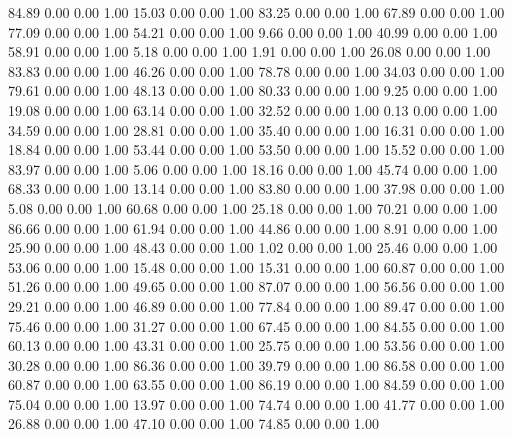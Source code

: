    84.89   0.00   0.00   1.00
   15.03   0.00   0.00   1.00
   83.25   0.00   0.00   1.00
   67.89   0.00   0.00   1.00
   77.09   0.00   0.00   1.00
   54.21   0.00   0.00   1.00
    9.66   0.00   0.00   1.00
   40.99   0.00   0.00   1.00
   58.91   0.00   0.00   1.00
    5.18   0.00   0.00   1.00
    1.91   0.00   0.00   1.00
   26.08   0.00   0.00   1.00
   83.83   0.00   0.00   1.00
   46.26   0.00   0.00   1.00
   78.78   0.00   0.00   1.00
   34.03   0.00   0.00   1.00
   79.61   0.00   0.00   1.00
   48.13   0.00   0.00   1.00
   80.33   0.00   0.00   1.00
    9.25   0.00   0.00   1.00
   19.08   0.00   0.00   1.00
   63.14   0.00   0.00   1.00
   32.52   0.00   0.00   1.00
    0.13   0.00   0.00   1.00
   34.59   0.00   0.00   1.00
   28.81   0.00   0.00   1.00
   35.40   0.00   0.00   1.00
   16.31   0.00   0.00   1.00
   18.84   0.00   0.00   1.00
   53.44   0.00   0.00   1.00
   53.50   0.00   0.00   1.00
   15.52   0.00   0.00   1.00
   83.97   0.00   0.00   1.00
    5.06   0.00   0.00   1.00
   18.16   0.00   0.00   1.00
   45.74   0.00   0.00   1.00
   68.33   0.00   0.00   1.00
   13.14   0.00   0.00   1.00
   83.80   0.00   0.00   1.00
   37.98   0.00   0.00   1.00
    5.08   0.00   0.00   1.00
   60.68   0.00   0.00   1.00
   25.18   0.00   0.00   1.00
   70.21   0.00   0.00   1.00
   86.66   0.00   0.00   1.00
   61.94   0.00   0.00   1.00
   44.86   0.00   0.00   1.00
    8.91   0.00   0.00   1.00
   25.90   0.00   0.00   1.00
   48.43   0.00   0.00   1.00
    1.02   0.00   0.00   1.00
   25.46   0.00   0.00   1.00
   53.06   0.00   0.00   1.00
   15.48   0.00   0.00   1.00
   15.31   0.00   0.00   1.00
   60.87   0.00   0.00   1.00
   51.26   0.00   0.00   1.00
   49.65   0.00   0.00   1.00
   87.07   0.00   0.00   1.00
   56.56   0.00   0.00   1.00
   29.21   0.00   0.00   1.00
   46.89   0.00   0.00   1.00
   77.84   0.00   0.00   1.00
   89.47   0.00   0.00   1.00
   75.46   0.00   0.00   1.00
   31.27   0.00   0.00   1.00
   67.45   0.00   0.00   1.00
   84.55   0.00   0.00   1.00
   60.13   0.00   0.00   1.00
   43.31   0.00   0.00   1.00
   25.75   0.00   0.00   1.00
   53.56   0.00   0.00   1.00
   30.28   0.00   0.00   1.00
   86.36   0.00   0.00   1.00
   39.79   0.00   0.00   1.00
   86.58   0.00   0.00   1.00
   60.87   0.00   0.00   1.00
   63.55   0.00   0.00   1.00
   86.19   0.00   0.00   1.00
   84.59   0.00   0.00   1.00
   75.04   0.00   0.00   1.00
   13.97   0.00   0.00   1.00
   74.74   0.00   0.00   1.00
   41.77   0.00   0.00   1.00
   26.88   0.00   0.00   1.00
   47.10   0.00   0.00   1.00
   74.85   0.00   0.00   1.00
